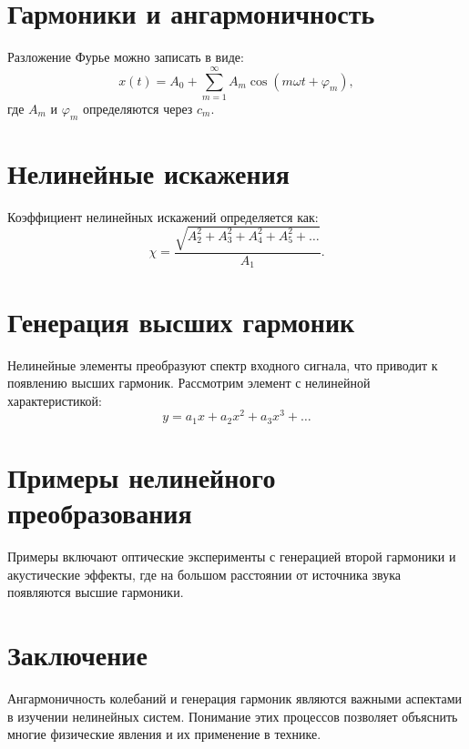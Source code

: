 \documentclass[10pt]{article}
\begin{document}
\section{Гармоники и ангармоничность}
Разложение Фурье можно записать в виде:
\begin{equation*}
x(t)=A_{0}+\sum_{m=1}^{\infty} A_{m} \cos \left(m \omega t+\varphi_{m}\right), \tag{3.8}
\end{equation*}
где $A_{m}$ и $\varphi_{m}$ определяются через $c_m$.

\section{Нелинейные искажения}
Коэффициент нелинейных искажений определяется как:
\begin{equation*}
\chi=\frac{\sqrt{A_{2}^{2}+A_{3}^{2}+A_{4}^{2}+A_{5}^{2}+\ldots}}{A_{1}}. \tag{3.11}
\end{equation*}

\section{Генерация высших гармоник}
Нелинейные элементы преобразуют спектр входного сигнала, что приводит к появлению высших гармоник. Рассмотрим элемент с нелинейной характеристикой:
\begin{equation*}
y=a_{1} x+a_{2} x^{2}+a_{3} x^{3}+\ldots \tag{3.12}
\end{equation*}

\section{Примеры нелинейного преобразования}
Примеры включают оптические эксперименты с генерацией второй гармоники и акустические эффекты, где на большом расстоянии от источника звука появляются высшие гармоники.

\section*{Заключение}
Ангармоничность колебаний и генерация гармоник являются важными аспектами в изучении нелинейных систем. Понимание этих процессов позволяет объяснить многие физические явления и их применение в технике.
\end{document}
